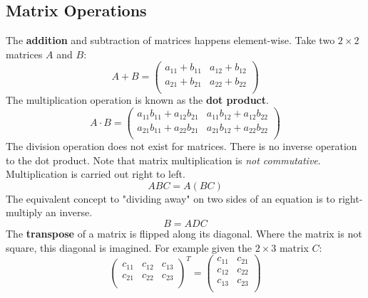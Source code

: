 \documentclass[10pt,a4paper,fleqn]{article} %
\begin{document}
\subsection{Matrix Operations} %
The \textbf{addition} and subtraction of matrices happens element-wise. Take two $2\times2$ matrices $A$ and $B$:
\begin{equation}
    A + B = 
    \begin{pmatrix}
        a_{11} + b_{11} & a_{12} + b_{12} \\
        a_{21} + b_{21} & a_{22} + b_{22} \\
    \end{pmatrix}
\end{equation}
The multiplication operation is known as the \textbf{dot product}.
\begin{equation}
    A \cdot B = 
    \begin{pmatrix}
        a_{11} b_{11} + a_{12} b_{21} & a_{11} b_{12} + a_{12} b_{22} \\
        a_{21} b_{11} + a_{22} b_{21} & a_{21} b_{12} + a_{22} b_{22} \\
    \end{pmatrix}
\end{equation}
The division operation does not exist for matrices. There is no inverse operation to
the dot product.
Note that matrix multiplication is \textit{not commutative}. Multiplication is carried out right to left.
\begin{equation*}
    ABC = A(BC)
\end{equation*}
The equivalent concept to "dividing away" on two sides of an equation is to right-multiply an inverse.
\begin{equation*}
    B = ADC
\end{equation*}
The \textbf{transpose} of a matrix is flipped along its diagonal.
Where the matrix is not square, this diagonal is imagined.
For example given the $2\times3$ matrix $C$:
\begin{equation}
    \begin{pmatrix}
        c_{11} & c_{12} & c_{13} \\
        c_{21} & c_{22} & c_{23} \\
    \end{pmatrix}^T
    =
    \begin{pmatrix}
        c_{11} & c_{21} \\
        c_{12} & c_{22} \\
        c_{13} & c_{23} \\
    \end{pmatrix}
\end{equation}
\end{document}

